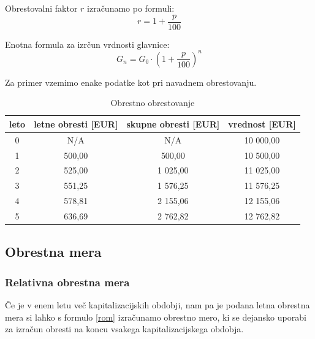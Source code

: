 \documentclass[12pt]{article}
\begin{document}
        Obrestovalni faktor $r$ izračunamo po formuli:
        \begin{equation}
            r = 1 + \frac{p}{100}
        \end{equation}
        
        Enotna formula za izrčun vrdnosti glavnice:
        \begin{equation}
            G_n = G_0 \cdot (1 + \frac{p}{100})^n
        \end{equation}

        \newpage
        Za primer vzemimo enake podatke kot pri navadnem obrestovanju.
        \begin{center}
            \begin{table}[h!]
                \centering
                \begin{tabular}{|c|c|c|c|}
                    \hline
                    \textbf{leto} & \textbf{letne obresti [EUR]} & \textbf{skupne obresti [EUR]} & \textbf{vrednost [EUR]} \\ \hline
                    0 & N/A & N/A & 10 000,00 \\ \hline
                    1 & 500,00 & 500,00 & 10 500,00 \\ \hline
                    2 & 525,00 & 1 025,00 & 11 025,00 \\ \hline
                    3 & 551,25 & 1 576,25 & 11 576,25 \\ \hline
                    4 & 578,81 & 2 155,06 & 12 155,06 \\ \hline
                    5 & 636,69 & 2 762,82 & 12 762,82 \\ \hline
                \end{tabular}
                \caption{Obrestno obrestovanje}
            \end{table}
        \end{center}

    \subsection{Obrestna mera}
        \subsubsection{Relativna obrestna mera}
        Če je v enem letu več kapitalizacijskih obdobji, nam pa je podana letna obrestna 
        mera si lahko s formulo \eqref{rom} izračunamo obrestno mero, ki se dejansko 
        uporabi za izračun obresti na koncu vsakega kapitalizacijskega obdobja.
\end{document}
